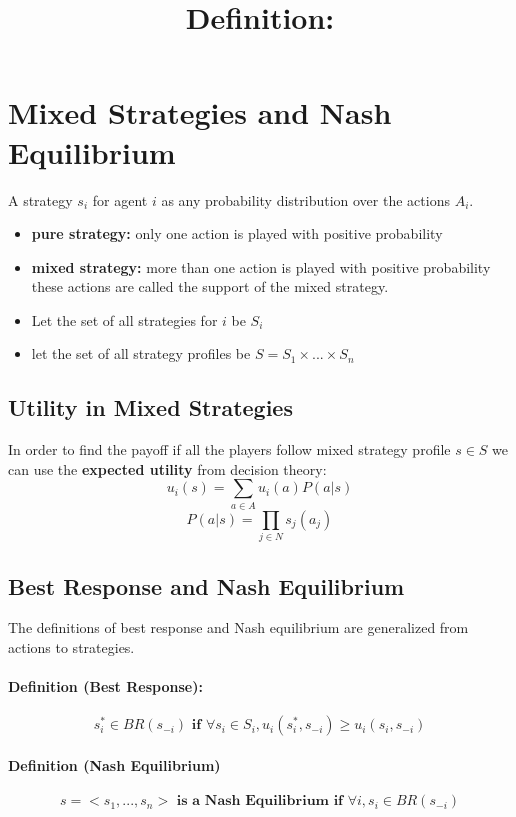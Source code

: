 \section{Mixed Strategies and Nash Equilibrium}
\title{\textbf{Definition:}}
A strategy $s_i$ for agent $i$ as any probability distribution over the actions $A_i$.
\begin{itemize}
\item \textbf{pure strategy:} only one action is played with positive probability
\item \textbf{mixed strategy:} more than one action is played with positive probability
\bigbreak
these actions are called the support of the mixed strategy.
\item Let the set of all strategies for $i$ be $S_i$
\item let the set of all strategy profiles be $S = S_1 \times... \times S_n$
\end{itemize}

\subsection{Utility in Mixed Strategies}
In order to find the payoff if all the players follow mixed strategy profile $s \in S$ we can use the \textbf{expected utility} from decision theory: 
\begin{equation} u_i(s) = \sum_{a \in A}u_i(a)P(a|s)\end{equation}
\begin{equation} P(a|s) = \prod_{j \in N}s_j(a_j)\end{equation}

\subsection{Best Response and Nash Equilibrium}The definitions of best response and Nash equilibrium are generalized from actions to strategies. 
\paragraph{Definition (Best Response): }
\begin{equation}
s_i^* \in BR(s_{-i}) \textbf{ if }   \forall s_i \in S_i, u_i(s_i^*,s_{-i}) \geq u_i(s_i, s_{-i})
\end{equation}
\paragraph{Definition (Nash Equilibrium)}
$$s = <s_1,...,s_n>\textbf{ is  a }\textbf{Nash Equilibrium if } \forall i, s_i \in BR(s_{-i})$$
